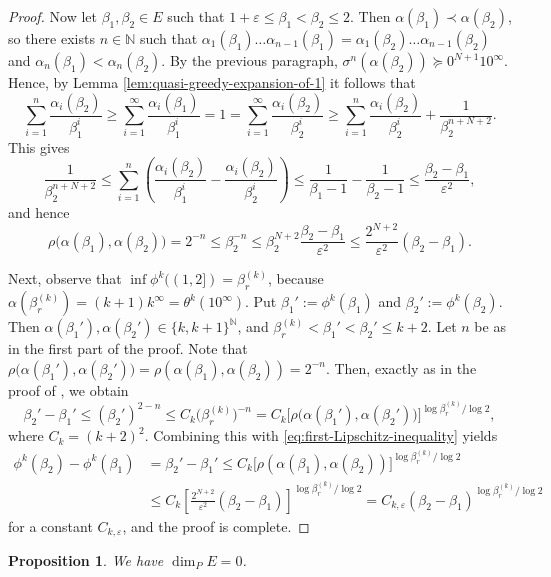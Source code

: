\documentclass[12pt]{amsart}
\newtheorem{proposition}[theorem]{Proposition}
\theoremstyle{definition}
\theoremstyle{remark}
\numberwithin{equation}{section}
\newcommand{\N}{\ensuremath{\mathbb{N}}}
\newcommand{\ep}{\varepsilon}
\newcommand{\f}{\infty}
\newcommand{\al}{\alpha}
\newcommand{\lge}{\succcurlyeq}
\newcommand{\si}{\sigma}
\begin{document}
{\begin{proof}
Now let $\beta_1,\beta_2\in E$ such that $1+\ep\leq\beta_1<\beta_2\leq 2$. Then $\al(\beta_1)\prec\al(\beta_2)$, so there exists $n\in\N$ such that $\al_1(\beta_1)\dots\al_{n-1}(\beta_1)=\al_1(\beta_2)\dots\al_{n-1}(\beta_2)$ and $\al_n(\beta_1)<\al_n(\beta_2)$. By the previous paragraph, $\si^n(\al(\beta_2))\lge 0^{N+1}10^\f$. Hence, by Lemma \ref{lem:quasi-greedy-expansion-of-1} it follows that
\[
{\sum_{i=1}^n\frac{\al_i(\beta_2)}{\beta_1^i}\ge\sum_{i=1}^\f\frac{\al_i(\beta_1)}{\beta^i_1}=}1=\sum_{i=1}^\f \frac{\al_i(\beta_2)}{\beta_2^i}\geq \sum_{i=1}^n \frac{\al_i(\beta_2)}{\beta_2^i}+\frac{1}{\beta_2^{n+N+2}}.
\]
This gives
\[
\frac{1}{\beta_2^{n+N+2}}\leq \sum_{i=1}^n\left(\frac{\al_i(\beta_2)}{\beta_1^i}- \frac{\al_i(\beta_2)}{\beta_2^i}\right)\le\frac{1}{\beta_1-1}-\frac{1}{\beta_2-1}\le \frac{\beta_2-\beta_1}{\ep^2},
\]
and hence
\begin{equation} \label{eq:first-Lipschitz-inequality}
\rho\big(\al(\beta_1),\al(\beta_2)\big)=2^{-n}\leq \beta_2^{-n}\leq \beta_2^{N+2}\frac{\beta_2-\beta_1}{\ep^2}\leq \frac{2^{N+2}}{\ep^2}(\beta_2-\beta_1).
\end{equation}

Next, observe that $\inf \phi^k((1,2])=\beta_r^{(k)}$, because $\al(\beta_r^{(k)})=(k+1)k^\f=\theta^k(10^\f)$.
Put $\beta_1':=\phi^k(\beta_1)$ and $\beta_2':=\phi^k(\beta_2)$. Then $\al(\beta_1'),\al(\beta_2')\in\{k,k+1\}^\N$, and $\beta_r^{(k)}<\beta_1'<\beta_2'\leq k+2$. Let $n$ be as in the first part of the proof. Note that $\rho\big(\al(\beta_1'),\al(\beta_2')\big)=\rho(\al(\beta_1),\al(\beta_2))=2^{-n}$. Then, exactly as in the proof of \cite[Lemma 3.7]{Allaart-Baker-Kong-2019}, we obtain
\[
\beta_2'-\beta_1'\leq (\beta_2')^{2-n}\leq C_k\big(\beta_r^{(k)}\big)^{-n}=C_k\big[\rho\big(\al(\beta_1'),\al(\beta_2')\big)\big]^{\log\beta_r^{(k)}/\log 2},
\]
where $C_k=(k+2)^2$.
Combining this with \eqref{eq:first-Lipschitz-inequality} yields
\begin{align*}
\phi^k(\beta_2)-\phi^k(\beta_1)&=\beta_2'-\beta_1'\leq C_k\big[\rho(\al(\beta_1),\al(\beta_2))\big]^{\log\beta_r^{(k)}/\log 2}\\
&\leq C_k\left[\frac{2^{N+2}}{\ep^2}(\beta_2-\beta_1)\right]^{\log\beta_r^{(k)}/\log 2}=C_{k,\ep}(\beta_2-\beta_1)^{\log\beta_r^{(k)}/\log 2}
\end{align*}
for a constant $C_{k,\ep}$, and the proof is complete.
\end{proof}

\begin{proposition} \label{prop:E-is-zero-dimensional}
We have $\dim_P E=0$.
\end{proposition}

}
\end{document}
